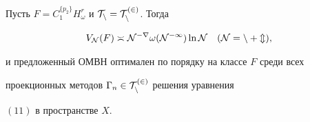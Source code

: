 \begin{thm} 


Пусть $F=C^{\{p_2\}}_1H^r_\omega$ и $\cal T_n=\cal T^{(2)}_n$. Тогда 


\begin{equation} 


V_{\cal N}(F)\asymp\cal N^{-r}\omega(\cal N^{-1})\ln\cal N\quad 


(\cal N=n+m), 


\end{equation} 


и предложенный ОМВН оптимален по порядку на классе $F$ среди всех 


проекционных методов $\Gamma_n\in\cal T^{(2)}_n$ решения уравнения 


$(11)$ в пространстве $X$. 


\end{thm} 


 



